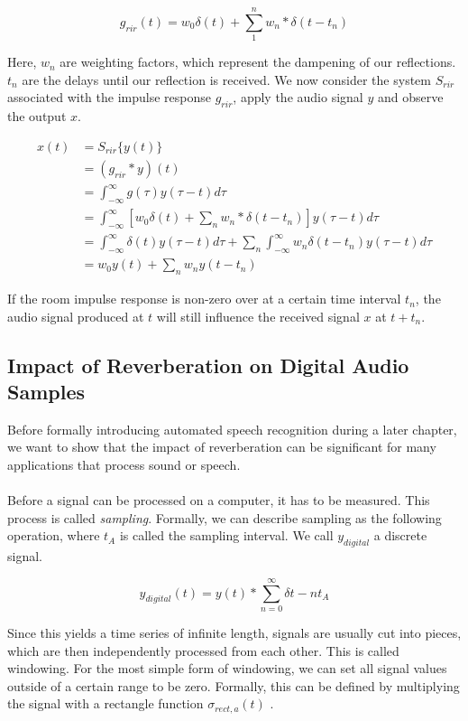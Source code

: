 \[
g_{rir}(t) = w_0 \delta(t) + \sum_{1}^{n} w_n * \delta(t - t_n)
\]

Here, $w_n$ are weighting factors, which represent the dampening of our reflections. $t_n$ are the delays until our reflection is received. We now consider the system $S_{rir}$ associated with the impulse response $g_{rir}$, apply the audio signal $y$ and observe the output $x$.

\begin{align*}
x(t) &= S_{rir}\{y(t)\} \\
     &= (g_{rir} * y)(t) \\
     &= \int_{-\infty}^{\infty} g(\tau)y(\tau - t) d\tau \\
     &= \int_{-\infty}^{\infty} \left[ w_0 \delta(t) + \sum_{n} w_n * \delta(t - t_n)\right] y(\tau - t) d\tau \\
     &= \int_{-\infty}^{\infty} \delta(t) y(\tau - t) d\tau + \sum_{n}  \int_{-\infty}^{\infty} w_n \delta(t - t_n) y(\tau - t) d\tau  \\
     &= w_0 y(t) + \sum_{n} w_n y(t - t_n)
\end{align*}

If the room impulse response is non-zero over at a certain time interval $t_n$, the audio signal produced at $t$ will still influence the received signal $x$ at $t + t_n$. 

\subsection{Impact of Reverberation on Digital Audio Samples}

Before formally introducing automated speech recognition during a later chapter, we want to show that the impact of reverberation can be significant for many applications that process sound or speech.\\ \\
Before a signal can be processed on a computer, it has to be measured. This process is called \textit{sampling}. Formally, we can describe sampling as the following operation, where $t_A$ is called the sampling interval. We call $y_{digital}$ a discrete signal. 

\[
y_{digital}(t) = y(t) * \sum_{n = 0}^{\infty} \delta{t - nt_A} 
\]

Since this yields a time series of infinite length, signals are usually cut into pieces, which are then independently processed from each other. This is called windowing. For the most simple form of windowing, we can set all signal values outside of a certain range to be zero. Formally, this can be defined by multiplying the signal with a rectangle function $\sigma_{rect,a}(t)$ .

